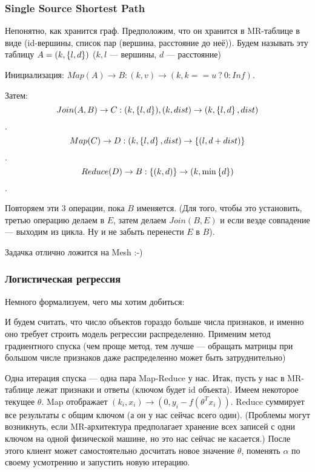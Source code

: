 \documentclass[12pt]{article}
\begin{document}
\subsubsection{Single Source Shortest Path}
Непонятно, как хранится граф. Предположим, что он хранится в MR-таблице в виде (id-вершины, список пар (вершина, расстояние до неё)). Будем называть эту таблицу $A=(k,\left\{l,d\right\})$  ($k,l$ --- вершины, $d$ --- расстояние)

Инициализация: $Map(A) \to B: (k,v) \to (k, k==u \:? \:0: Inf)$.

Затем: $$Join(A,B) \to C: (k,\left\{l,d\right\}), (k, dist) \to (k,\left\{l,d\right\}, dist)$$.
$$Map(C) \to D: (k,\left\{l,d\right\}, dist) \to \left\{(l, d+dist)\right\}$$.
$$Reduce(D) \to B: \left\{(k,d)\right\} \to (k,\min\left\{d\right\})$$.

Повторяем эти 3 операции, пока $B$ именяется. (Для того, чтобы это установить, третью операцию делаем в $E$, затем делаем $Join(B,E)$ и если везде совпадение --- выходим из цикла. Ну и не забыть перенести $E$ в $B$).

Задачка отлично ложится на Mesh :-)
\subsubsection{Логистическая регрессия}
Немного формализуем, чего мы хотим добиться:

И будем считать, что число объектов гораздо больше числа признаков, и именно оно требует строить модель регрессии распределенно.
Применим метод градиентного спуска (чем проще метод, тем лучше — обращать матрицы при большом числе признаков даже распределенно может быть затруднительно)

Одна итерация спуска --- одна пара Map-Reduce у нас.
Итак, пусть у нас в MR-таблице лежат признаки и ответы (ключом будет id объекта). Имеем некоторое текущее $\theta$. Map отображает $(k_i, x_i) \to (0, y_i - f(\theta^Tx_i))$. Reduce суммирует все результаты с общим ключом (а он у нас сейчас всего один). (Проблемы могут возникнуть, если MR-архитектура предполагает хранение всех записей с одни ключом на одной физической машине, но это нас сейчас не касается.) После этого клиент может самостоятельно досчитать новое значение $\theta$, поменять $\alpha$ по своему усмотрению и запустить новую итерацию.
\end{document}
